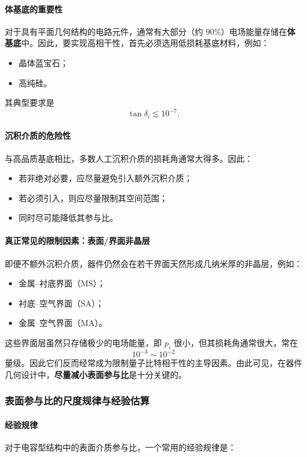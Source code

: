 \documentclass[12pt,a4paper,oneside]{ctexbook}
\begin{document}
\paragraph{体基底的重要性}
对于具有平面几何结构的电路元件，通常有大部分（约 \(90\%\)）电场能量存储在\textbf{体基底}中。因此，要实现高相干性，首先必须选用低损耗基底材料，例如：
\begin{itemize}
    \item 晶体蓝宝石；
    \item 高纯硅。
\end{itemize}
其典型要求是
\[
\tan\delta_i \lesssim 10^{-7}.
\]

\paragraph{沉积介质的危险性}
与高品质基底相比，多数人工沉积介质的损耗角通常大得多。因此：
\begin{itemize}
    \item 若非绝对必要，应尽量避免引入额外沉积介质；
    \item 若必须引入，则应尽量限制其空间范围；
    \item 同时尽可能降低其参与比。
\end{itemize}

\paragraph{真正常见的限制因素：表面/界面非晶层}
即便不额外沉积介质，器件仍然会在若干界面天然形成几纳米厚的非晶层，例如：
\begin{itemize}
    \item 金属--衬底界面（MS）；
    \item 衬底--空气界面（SA）；
    \item 金属--空气界面（MA）。
\end{itemize}

这些界面层虽然只存储极少的电场能量，即 \(p_i\) 很小，但其损耗角通常很大，常在
\[
10^{-3}\sim 10^{-2}
\]
量级。因此它们反而经常成为限制量子比特相干性的主导因素。由此可见，在器件几何设计中，\textbf{尽量减小表面参与比}是十分关键的。

\subsubsection{表面参与比的尺度规律与经验估算}

\paragraph{经验规律}
对于电容型结构中的表面介质参与比，一个常用的经验规律是：
\end{document}
